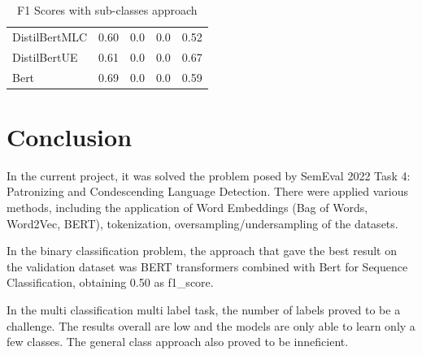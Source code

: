 \documentclass[11pt]{article}
\begin{document}
\begin{table}[h]
\begin{tabular}{|l|llll}
		DistilBertMLC               & 0.60                        & 0.0  & 0.0                       & \multicolumn{1}{l|}{0.52} \\
		DistilBertUE                & 0.61                        & 0.0  & 0.0                       & \multicolumn{1}{l|}{0.67} \\
		Bert                        & 0.69                        & 0.0  & 0.0                       & \multicolumn{1}{l|}{0.59} \\ \hline
	\end{tabular}
	\caption{F1 Scores with sub-classes approach}
	\label{tab:task2_2}
\end{table}

\section{Conclusion}

In the current project, it was solved the problem posed by SemEval 2022 Task
4: Patronizing and Condescending Language Detection. There were applied
various methods, including the application of Word Embeddings (Bag of Words,
Word2Vec, BERT), tokenization, oversampling/undersampling of the datasets.

In the binary classification problem, the approach that gave the best result
on the validation dataset was BERT transformers combined with Bert for
Sequence Classification, obtaining 0.50 as f1\_score.

In the multi classification multi label task, the number of labels proved to
be a challenge. The results overall are low and the models are only able to learn
only a few classes. The general class approach also proved to be inneficient.


\end{document}
